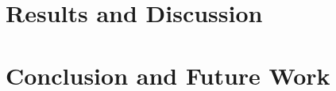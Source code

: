 \documentclass[a4paper,12pt]{report}
\begin{document}
\chapter{Results and Discussion}

\chapter{Conclusion and Future Work}

\fontsize{12}{8}\selectfont


\end{document}
